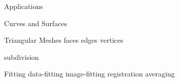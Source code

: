 \begin{plSection}{Applications}
\begin{plSection}{Curves and Surfaces}
\begin{plSection}{Triangular Meshes}
{faces}
{edges}
{vertices}
\end{plSection}%
{subdivision}
\begin{plSection}{Fitting}
{data-fitting}
{image-fitting}
{registration}
{averaging}
\end{plSection} %
\end{plSection}%
\end{plSection}%
\BeginAppendices

